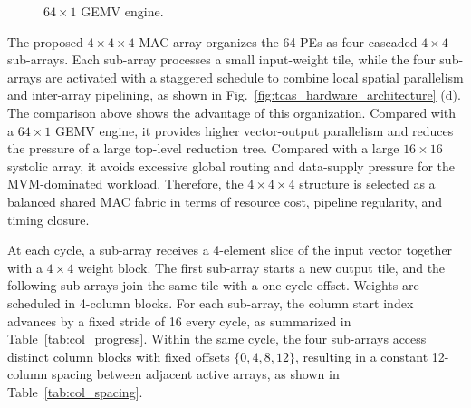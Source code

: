 \documentclass[11pt,twoside]{eitExjobb}
\begin{document}
\begin{figure}[H]
  \centering
  
  \caption{$64\times1$ GEMV engine.}
  \label{fig:gemv}
\end{figure}

The proposed $4\times4\times4$ MAC array organizes the 64 PEs as four cascaded
$4\times4$ sub-arrays. Each sub-array processes a small input-weight tile, while the
four sub-arrays are activated with a staggered schedule to combine local spatial
parallelism and inter-array pipelining, as shown in Fig.~\ref{fig:tcas_hardware_architecture} (d). The comparison above shows the advantage of
this organization. Compared with a $64\times1$ GEMV engine, it provides higher
vector-output parallelism and reduces the pressure of a large top-level reduction
tree. Compared with a large $16\times16$ systolic array, it avoids excessive global
routing and data-supply pressure for the MVM-dominated workload. Therefore, the
$4\times4\times4$ structure is selected as a balanced shared MAC fabric in terms of
resource cost, pipeline regularity, and timing closure.

\begin{table}[H]
\centering
\caption{Comparison of candidate MAC array organizations for projection computation.}
\label{tab:mac_array_tradeoff}
\end{table}

At each cycle, a sub-array receives a 4-element slice of the input vector together
with a $4\times4$ weight block. The first sub-array starts a new output tile, and
the following sub-arrays join the same tile with a one-cycle offset. Weights are
scheduled in 4-column blocks. For each sub-array, the column start index advances
by a fixed stride of 16 every cycle, as summarized in
Table~\ref{tab:col_progress}. Within the same cycle, the four sub-arrays access
distinct column blocks with fixed offsets \(\{0,4,8,12\}\), resulting in a
constant 12-column spacing between adjacent active arrays, as shown in
Table~\ref{tab:col_spacing}.
\end{document}
